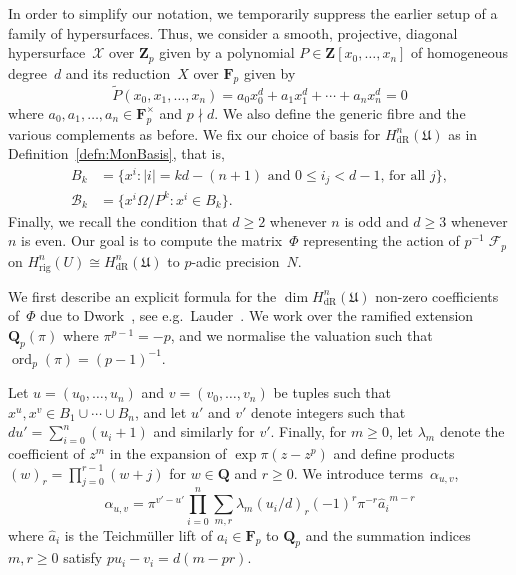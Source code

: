 \documentclass[a4paper,11pt]{article}
\numberwithin{equation}{section}
\providecommand{\abs}[1]{\lvert#1\rvert}                 %
\newcommand{\ZZ}{\mathbf{Z}} %
\newcommand{\QQ}{\mathbf{Q}} %
\newcommand{\FF}{\mathbf{F}} %
\DeclareMathOperator{\ord}{ord}          %
\DeclareMathOperator{\Frob}{\mathcal{F}} %
\providecommand{\HdR}{H_{\text{dR}}}    %
\providecommand{\Hrig}{H_{\text{rig}}}  %
\theoremstyle{definition}
\begin{document}
In order to simplify our notation, we temporarily suppress the earlier 
setup of a family of hypersurfaces. Thus, we consider a smooth, 
projective, diagonal hypersurface~$\mathcal{X}$ over $\ZZ_p$ given by 
a polynomial $P \in \ZZ[x_0, \dotsc, x_n]$ of homogeneous degree~$d$ 
and its reduction~$X$ over $\mathbf{F}_p$ given by 
\begin{equation}
\tilde{P}(x_0, x_1, \dotsc, x_n) = 
    a_0 x_0^d + a_1 x_1^d + \dotsb + a_n x_n^d = 0
\end{equation}
where $a_0, a_1, \dotsc, a_n \in \FF_p^{\times}$ and $p \nmid d$.  
We also define the generic fibre and the various complements as 
before.  We fix our choice of basis for $\HdR^{n}(\mathfrak{U})$ 
as in Definition~\ref{defn:MonBasis}, that is, 
\begin{align}
B_k & = \{ x^i : \text{$\abs{i} = kd - (n+1)$ and $0 \leq i_j < d-1$, for all $j$} \}, \\
\mathcal{B}_k & = \{x^i \Omega / P^k : x^i \in B_k \}.
\end{align}
Finally, we recall the condition that $d \geq 2$ whenever $n$ is 
odd and $d \geq 3$ whenever $n$ is even.  Our goal is to compute 
the matrix~$\Phi$ representing the action of $p^{-1} \Frob_p$ on 
$\Hrig^n(U) \cong \HdR^n(\mathfrak{U})$ to $p$-adic precision~$N$.

We first describe an explicit formula for the $\dim \HdR^n(\mathfrak{U})$ 
non-zero coefficients of~$\Phi$ due to Dwork~\citep{Dwork1964}, see 
e.g.\ Lauder~\citep[\S 6.1]{Lauder2004b}.   We work over the ramified 
extension~$\QQ_p(\pi)$ where $\pi^{p-1} = -p$, and we normalise 
the valuation such that \mbox{$\ord_p(\pi) = (p-1)^{-1}$}.

Let $u = (u_0, \dotsc, u_n)$ and $v = (v_0, \dotsc, v_n)$ be tuples such 
that $x^u, x^v \in B_1 \cup \dotsb \cup B_n$,  and let $u'$ and $v'$ 
denote integers such that $d u' = \sum_{i=0}^n (u_i + 1)$ and similarly 
for $v'$.  Finally, for $m \geq 0$, let $\lambda_m$ denote the coefficient 
of $z^m$ in the expansion of $\exp \pi (z - z^p)$ and define products 
$(w)_r = \prod_{j=0}^{r-1} (w + j)$ for $w \in \QQ$ and $r \geq 0$. 
We introduce terms~$\alpha_{u,v}$, 
\begin{equation} \label{eq:alpha}
\alpha_{u,v} = \pi^{v' - u'} \prod_{i = 0}^n \sum_{m, r} \lambda_m (u_i / d)_r (-1)^r \pi^{-r} {\hat{a}_i}^{m-r}
\end{equation}
where $\hat{a}_i$ is the Teichm\"uller lift of $a_i \in \mathbf{F}_p$ 
to $\QQ_p$ and the summation indices $m, r \geq 0$ satisfy 
$p u_i - v_i = d (m - pr)$.
\end{document}
